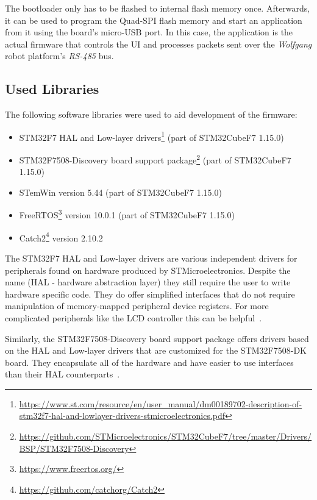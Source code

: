 The bootloader only has to be flashed to internal flash memory once. Afterwards, it can be used to
program the Quad-SPI flash memory and start an application from it using the board's micro-USB port.
In this case, the application is the actual firmware that controls the UI and processes packets
sent over the \textit{Wolfgang} robot platform's \textit{RS-485} bus.

\subsection{Used Libraries}
\label{implementation/software/used-libraries}

The following software libraries were used to aid development of the firmware:

\begin{itemize}
    \item STM32F7 HAL and Low-layer drivers\footnote{\url{https://www.st.com/resource/en/user_manual/dm00189702-description-of-stm32f7-hal-and-lowlayer-drivers-stmicroelectronics.pdf}}
          (part of STM32CubeF7 1.15.0)
    \item STM32F7508-Discovery board support package\footnote{\url{https://github.com/STMicroelectronics/STM32CubeF7/tree/master/Drivers/BSP/STM32F7508-Discovery}}
          (part of STM32CubeF7 1.15.0)
    \item STemWin version 5.44 (part of STM32CubeF7 1.15.0)
    \item FreeRTOS\footnote{\url{https://www.freertos.org/}} version 10.0.1 (part of STM32CubeF7 1.15.0)
    \item Catch2\footnote{\url{https://github.com/catchorg/Catch2}} version 2.10.2
\end{itemize}

The STM32F7 HAL and Low-layer drivers are various independent drivers for peripherals found on
hardware produced by STMicroelectronics. Despite the name (HAL - hardware abstraction layer) they
still require the user to write hardware specific code. They do offer simplified interfaces that do
not require manipulation of memory-mapped peripheral device registers. For more complicated peripherals
like the LCD controller this can be helpful~\cite{stm32-hal-docs}.

Similarly, the STM32F7508-Discovery board support package offers drivers based on the HAL and
Low-layer drivers that are customized for the STM32F7508-DK board. They encapsulate all of the
hardware and have easier to use interfaces than their HAL counterparts~\cite{stm32-cube-getting-started}.

